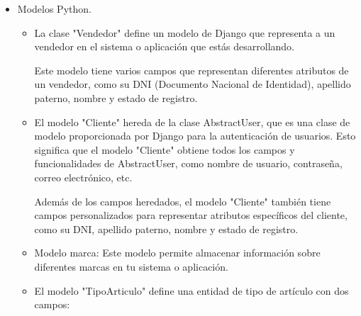 \documentclass{article}
\begin{document}
\begin{itemize}
\begin{itemize}
            \item Modelos Python.
            \begin{itemize}
                \item La clase "Vendedor" define un modelo de Django que representa a un vendedor en el sistema o aplicación que estás desarrollando.

                Este modelo tiene varios campos que representan diferentes atributos de un vendedor, como su DNI (Documento Nacional de Identidad), apellido paterno, nombre y estado de registro.
                \item El modelo "Cliente" hereda de la clase AbstractUser, que es una clase de modelo proporcionada por Django para la autenticación de usuarios. Esto significa que el modelo "Cliente" obtiene todos los campos y funcionalidades de AbstractUser, como nombre de usuario, contraseña, correo electrónico, etc.

                Además de los campos heredados, el modelo "Cliente" también tiene campos personalizados para representar atributos específicos del cliente, como su DNI, apellido paterno, nombre y estado de registro.
                
                \item Modelo marca: Este modelo permite almacenar información sobre diferentes marcas en tu sistema o aplicación.
                \item El modelo "TipoArticulo" define una entidad de tipo de artículo con dos campos:


\end{itemize}
\end{itemize}
\end{itemize}
\end{document}
